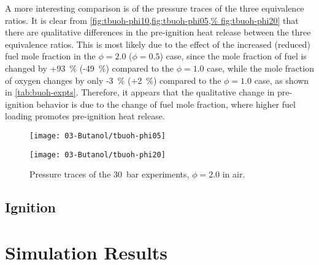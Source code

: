 \documentclass[../main.tex]{subfiles}
\begin{document}
A more interesting comparison is of the pressure traces of the three
equivalence ratios. It is clear from \cref{fig:tbuoh-phi10,fig:tbuoh-phi05,%
fig:tbuoh-phi20} that there are qualitative differences in the pre-ignition
heat release between the three equivalence ratios. This is most likely
due to the effect of the increased (reduced) fuel mole fraction in the
$\phi=\num{2.0}$ ($\phi=\num{0.5}$) case, since the mole fraction of
fuel is changed by +\SI{93}{\percent} (-\SI{49}{\percent}) compared to the $\phi=\num{1.0}$ case, while the
mole fraction of oxygen changes by only -\SI{3}{\percent} (+\SI{2}{\percent}) compared to the $\phi=\num{1.0}$
case, as shown in \cref{tab:buoh-expts}. Therefore, it appears that the
qualitative change in pre-ignition behavior is due to the change of fuel mole
fraction, where higher fuel loading promotes pre-ignition heat release.

\begin{figure}
    \begin{floatrow}
    \ffigbox
        {\texttt{[image: 03-Butanol/tbuoh-phi05]}}
        {\caption{Pressure traces of the \SI{30}{\bar} \tBuOH{} experiments,
            $\phi=\num{0.5}$ in air.}
        \label{fig:tbuoh-phi05}}
    \ffigbox
        {\texttt{[image: 03-Butanol/tbuoh-phi20]}}
        {\caption{Pressure traces of the \SI{30}{\bar} \tBuOH{} experiments,
            $\phi=\num{2.0}$ in air.}
        \label{fig:tbuoh-phi20}}
    \end{floatrow}
\end{figure}

\subsection{\iBuOH{} Ignition}

\section{Simulation Results}
\label{sec:buoh-sims}
\end{document}

